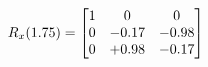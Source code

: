 \documentclass[preview]{standalone}
\begin{document}
\begin{align*}
\special{dvisvgm:raw <g id='unique000'>}R_{x}(1.75) = \begin{bmatrix}1 & 0 & 0 \\0 & -0.17 & -0.98 \\0 & +0.98 & -0.17\end{bmatrix}\special{dvisvgm:raw </g>}
\end{align*}
\end{document}
